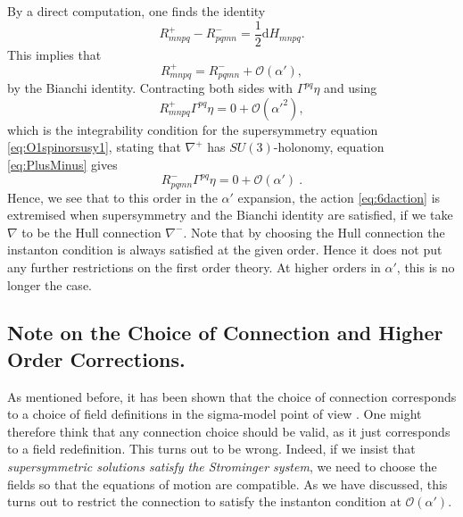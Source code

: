 \documentclass[12pt,a4paper]{article}
\def\a{\alpha'}
\def\d{\textrm{d}}
\def\OO{\mathcal{O}}
\theoremstyle{definition}
\begin{document}
By a direct computation, one finds the identity
\begin{equation}
\label{eq:curvatureid}
R^+_{mnpq}-R^-_{pqmn}=\frac{1}{2}\d H_{mnpq}.
\end{equation}
This implies that 
\begin{equation}
R^+_{mnpq}=R^-_{pqmn}+\OO(\a),\label{eq:PlusMinus}
\end{equation}
by the Bianchi identity. Contracting both sides with $\Gamma^{pq}\eta$ and using
\begin{equation}
R^+_{mnpq}\Gamma^{pq}\eta=0+\OO(\a^2),
\end{equation}
which is the integrability condition for the supersymmetry equation \eqref{eq:O1spinorsusy1}, stating that $\nabla^+$ has $SU(3)$-holonomy,  equation \eqref{eq:PlusMinus} gives
\begin{equation}
R^-_{pqmn}\Gamma^{pq}\eta=0+\OO(\a)\:.
\end{equation}
Hence, we see that to this order in the $\alpha'$ expansion, the action \eqref{eq:6daction} is extremised when supersymmetry and the Bianchi identity are satisfied, if we take $\nabla$ to be the Hull connection $\nabla^-$. 
Note that by choosing the Hull connection the instanton condition is always satisfied at the given order. Hence it does not put any further restrictions on the first order theory. At higher orders in $\alpha'$, this is no longer the case. 

\subsection{Note on the Choice of Connection and Higher Order Corrections.}
As mentioned before, it has been shown that the choice of connection corresponds to a choice of field definitions in the sigma-model point of view \cite{Sen1986289}. One might therefore think that any connection choice should be valid, as it just corresponds to a field redefinition. This turns out to be wrong. Indeed, if we insist that {\it supersymmetric solutions satisfy the Strominger system}, we need to choose the fields so that the equations of motion are compatible. As we have discussed, this turns out to restrict the connection to satisfy the instanton condition at $\OO(\a)$. 
\end{document}
